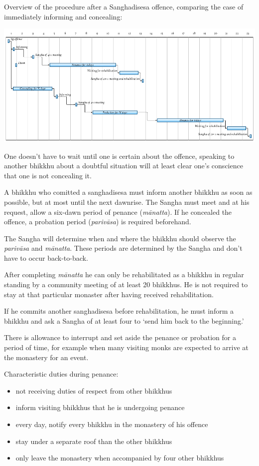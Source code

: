 Overview of the procedure after a Sanghadisesa offence, comparing the
case of immediately informing and concealing:

\includegraphics{../../src/includes/figures/sanghadisesa-procedure.png}

One doesn't have to wait until one is certain about the offence,
speaking to another bhikkhu about a doubtful situation will at least
clear one's conscience that one is not concealing it.

A bhikkhu who comitted a sanghadisesa must inform another bhikkhu as
soon as possible, but at most until the next dawnrise. The Sangha must
meet and at his request, allow a six-dawn period of penance
(\emph{mānatta}). If he concealed the offence, a probation period
(\emph{parivāsa}) is required beforehand.

The Sangha will determine when and where the bhikkhu should observe the
\emph{parivāsa} and \emph{mānatta}. These periods are determined by the
Sangha and don't have to occur back-to-back.

After completing \emph{mānatta} he can only be rehabilitated as a
bhikkhu in regular standing by a community meeting of at least 20
bhikkhus. He is not required to stay at that particular monaster after
having received rehabilitation.

If he commits another sanghadisesa before rehabilitation, he must inform
a bhikkhu and ask a Sangha of at least four to `send him back to the
beginning.'

There is allowance to interrupt and set aside the penance or probation
for a period of time, for example when many visiting monks are expected
to arrive at the monastery for an event.

Characteristic duties during penance:

\begin{itemize}
\tightlist
\item
  not receiving duties of respect from other bhikkhus
\item
  inform visiting bhikkhus that he is undergoing penance
\item
  every day, notify every bhikkhu in the monastery of his offence
\item
  stay under a separate roof than the other bhikkhus
\item
  only leave the monastery when accompanied by four other bhikkhus
\end{itemize}

